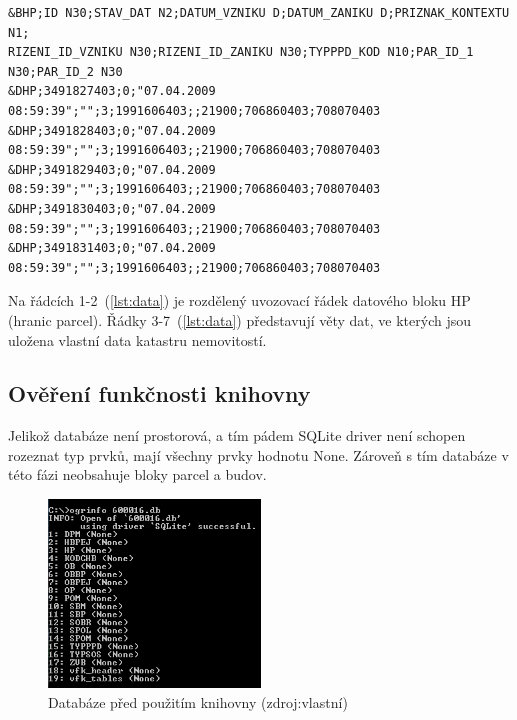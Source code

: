 {\scriptsize
\begin{lstlisting}[caption=Ukázka bloku hranic parcel(HP) -- definice bloků a věty dat(zdroj: vlastní), label=lst:data]
&BHP;ID N30;STAV_DAT N2;DATUM_VZNIKU D;DATUM_ZANIKU D;PRIZNAK_KONTEXTU N1;
RIZENI_ID_VZNIKU N30;RIZENI_ID_ZANIKU N30;TYPPPD_KOD N10;PAR_ID_1 N30;PAR_ID_2 N30
&DHP;3491827403;0;"07.04.2009 08:59:39";"";3;1991606403;;21900;706860403;708070403 
&DHP;3491828403;0;"07.04.2009 08:59:39";"";3;1991606403;;21900;706860403;708070403
&DHP;3491829403;0;"07.04.2009 08:59:39";"";3;1991606403;;21900;706860403;708070403
&DHP;3491830403;0;"07.04.2009 08:59:39";"";3;1991606403;;21900;706860403;708070403
&DHP;3491831403;0;"07.04.2009 08:59:39";"";3;1991606403;;21900;706860403;708070403
\end{lstlisting}}
Na řádcích 1-2~(\ref{lst:data}) je rozdělený uvozovací řádek datového
bloku HP (hranic parcel). Řádky 3-7~(\ref{lst:data}) představují věty
dat, ve kterých jsou uložena vlastní data katastru nemovitostí.

\subsection{Ověření funkčnosti knihovny}
\label{subsec:funkcnost_knihovny}
Jelikož databáze není prostorová, a tím pádem SQLite driver není schopen
rozeznat typ prvků, mají všechny prvky hodnotu None. Zároveň s tím databáze v této fázi
neobsahuje bloky parcel a budov.
\begin{figure}[H]
	 \centering
      \includegraphics[height=5cm]{./pictures/funkcnost_knihovny_pred.png}
      \caption{Databáze před použitím knihovny (zdroj:vlastní)}
      \label{fig:funkcnost_pred}
\end{figure}

